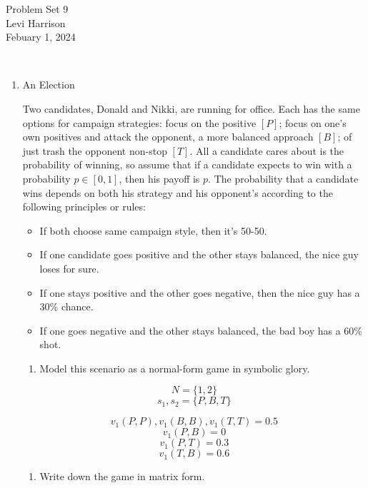 \documentclass{article}
\begin{document}
\begin{center}
    \LARGE{Problem Set 9}\\[0.5em]
    \large{Levi Harrison}\\[0.5em]
    \small{Febuary 1, 2024}
\end{center}

\,

\begin{enumerate}
    \item An Election

          Two candidates, Donald and Nikki, are running for office. Each has the same options for campaign strategies: focus on the positive $[P]$; focus on one's own positives and attack the opponent, a more balanced approach $[B]$; of just trash the opponent non-stop $[T]$. All a candidate cares about is the probability of winning, so assume that if a candidate expects to win with a probability $p \in [0, 1]$, then his payoff is $p$. The probability that a candidate wins depends on both his strategy and his opponent's according to the following principles or rules:

          \begin{itemize}
              \item If both choose same campaign style, then it's 50-50.
              \item If one candidate goes positive and the other stays balanced, the nice guy loses for sure.
              \item If one stays positive and the other goes negative, then the nice guy has a 30\% chance.
              \item If one goes negative and the other stays balanced, the bad boy has a 60\% shot.
          \end{itemize}

          \begin{enumerate}[label=(\alph*)]
              \item Model this scenario as a normal-form game in symbolic glory.
          \end{enumerate}

          \[N = \{1, 2\}\]
          \[s_1, s_2 = \{P, B, T\}\]

          \[v_1(P, P), v_1(B, B), v_1(T, T) = 0.5\]
          \[v_1(P, B) = 0\]
          \[v_1(P, T) = 0.3\]
          \[v_1(T, B) = 0.6\]

          \begin{enumerate}[resume]
              \item Write down the game in matrix form.
          \end{enumerate}


\end{enumerate}
\end{document}
